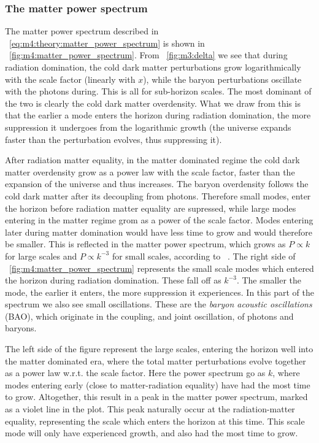     \subsubsection{The matter power spectrum}
        The matter power spectrum described in ~\cref{eq:m4:theory:matter_power_spectrum} is shown in ~\cref{fig:m4:matter_power_spectrum}. From ~\cref{fig:m3:delta} we see that during radiation domination, the cold dark matter perturbations grow logarithmically with the scale factor (linearly with $x$), while the baryon perturbations oscillate with the photons during. This is all for sub-horizon scales. The most dominant of the two is clearly the cold dark matter overdensity. What we draw from this is that the earlier a mode enters the horizon during radiation domination, the more suppression it undergoes from the logarithmic growth (the universe expands faster than the perturbation evolves, thus suppressing it). 

        After radiation matter equality, in the matter dominated regime the cold dark matter overdensity grow as a power law with the scale factor, faster than the expansion of the universe and thus increases. The baryon overdensity follows the cold dark matter after its decoupling from photons. Therefore small modes, enter the horizon before radiation matter equality are supressed, while large modes entering in the matter regime grom as a power of the scale factor. Modes entering later during matter domination would have less time to grow and would therefore be smaller.  This is reflected in the matter power spectrum, which grows as $P\propto k$ for large scales and $P\propto k^{-3}$ for small scales, according to ~\cite{dodelson2020modern}. The right side of ~\cref{fig:m4:matter_power_spectrum} represents the small scale modes which entered the horizon during radiation domination. These fall off as $k^{-3}$. The smaller the mode, the earlier it enters, the more suppression it experiences. In this part of the spectrum we also see small oscillations. These are the \textit{baryon acoustic oscillations} (BAO), which originate in the coupling, and joint oscillation, of photons and baryons. 
        
        The left side of the figure represent the large scales, entering the horizon well into the matter dominated era, where the total matter perturbations evolve together as a power law w.r.t. the scale factor. Here the power spectrum go as $k$, where modes entering early (close to matter-radiation equality) have had the most time to grow. Altogether, this result in a peak in the matter power spectrum, marked as a violet line in the plot. This peak naturally occur at the radiation-matter equality, representing the scale which enters the horizon at this time. This scale mode will only have experienced growth, and also had the most time to grow. 


